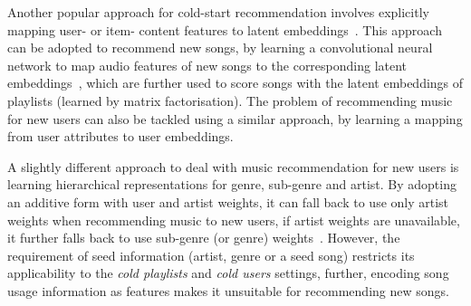 Another popular approach for cold-start recommendation involves explicitly mapping 
user- or item- content features to latent embeddings~\cite{Gantner:2010}.
This approach can be adopted to recommend new songs, 
\eg by learning a convolutional neural network to map audio features of new songs to 
the corresponding latent embeddings~\cite{van2013deep},
which are further used to score songs with the latent embeddings of playlists (learned by matrix factorisation).
The problem of recommending music for new users can also be tackled using a similar approach, \eg
by learning a mapping from user attributes to user embeddings.

A slightly different approach to deal with music recommendation for new users is learning hierarchical 
representations for genre, sub-genre and artist.
By adopting an additive form with user and artist weights, it can fall back to use only artist weights
when recommending music to new users, if artist weights are unavailable, it further falls back to use 
sub-genre (or genre) weights~\cite{ben2017groove}.
However, the requirement of seed information (\eg artist, genre or a seed song) restricts its applicability to
the \emph{cold playlists} and \emph{cold users} settings, %
further, encoding song usage information as features makes it unsuitable for recommending new songs.
%
%



